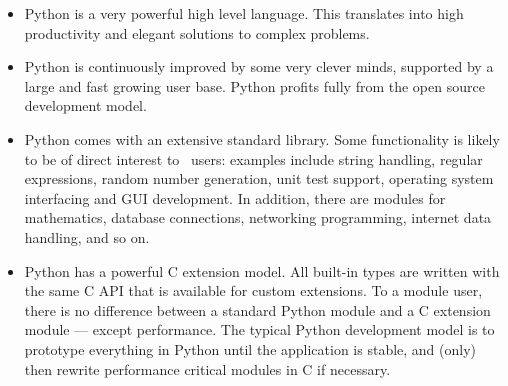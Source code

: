\begin{itemize}

\item Python is a very powerful high level language. This translates
into high productivity and elegant solutions to complex problems.

\item  Python is continuously improved by some very clever 
minds, supported by a large and fast growing user base. Python profits
fully from the open source development model.

\item Python comes with an extensive standard library. Some
functionality is likely to be of direct interest to \myhdl\ users:
examples include string handling, regular expressions, random number
generation, unit test support, operating system interfacing and GUI
development. In addition, there are modules for mathematics, database
connections, networking programming, internet data handling, and so
on.

\item Python has a powerful C extension model. All built-in types are
written with the same C API that is available for custom
extensions. To a module user, there is no difference between a
standard Python module and a C extension module --- except
performance. The typical Python development model is to prototype
everything in Python until the application is stable, and (only) then
rewrite performance critical modules in C if necessary.

\end{itemize}






